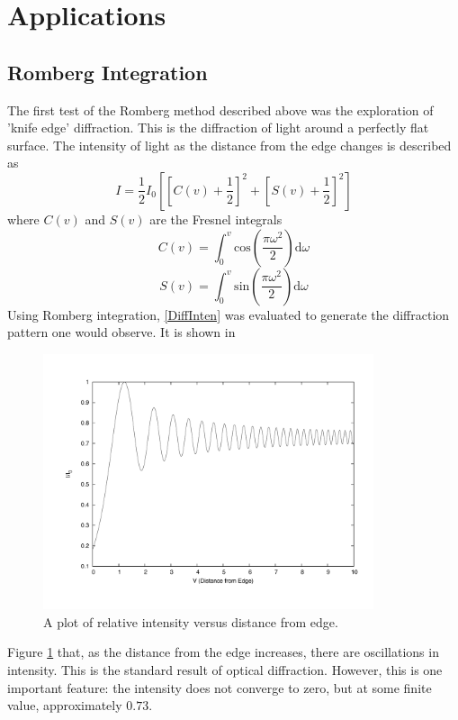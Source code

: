 \documentclass[12pt]{article}
\begin{document}
\section{Applications}
\subsection{Romberg Integration}
The first test of the Romberg method described above was the exploration of 'knife edge' diffraction.  This is the diffraction of light around a perfectly flat surface.  The intensity of light as the distance from the edge changes is described as
\begin{equation}
\label{DiffInten}
I=\frac{1}{2}I_0 [ [C(v) + \frac{1}{2}]^2 + [S(v) + \frac{1}{2}]^2]
\end{equation}
where $C(v)$ and $S(v)$ are the Fresnel integrals
\begin{equation}
\label{CFres}
C(v) = \int_0^v \mathrm{cos}(\frac{\pi\omega^2}{2}) \mathrm{d}\omega
\end{equation}
\begin{equation}
\label{SFres}
S(v) = \int_0^v \mathrm{sin}(\frac{\pi\omega^2}{2}) \mathrm{d}\omega
\end{equation}
Using Romberg integration, \eqref{DiffInten} was evaluated to generate the diffraction pattern one would observe.  It is shown in 
\begin{figure}[!h]
\centering
\includegraphics[width =120 mm, height = 75mm]{Ex_4_4.pdf}
\caption{A plot of relative intensity versus distance from edge.}
\label{fig:DiffInten}
\end{figure}
Figure \ref{fig:DiffInten} that, as the distance from the edge increases, there are oscillations in intensity.  This is the standard result of optical diffraction.  However, this is one important feature:  the intensity does not converge to zero, but at some finite value, approximately $0.73$.
\end{document}
